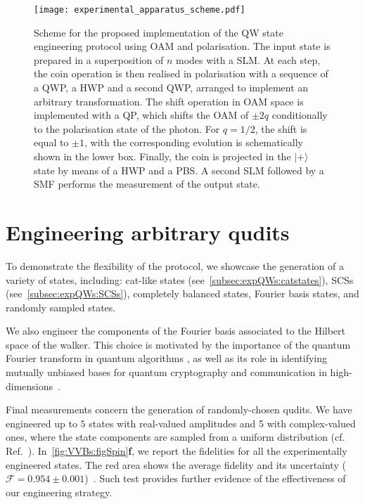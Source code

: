 \begin{figure}[tb]
\centering
\texttt{[image: experimental\_apparatus\_scheme.pdf]}
\caption{
    Scheme for the proposed implementation of the QW state engineering protocol using \ac{OAM} and polarisation.
    The input state is prepared in a superposition of $n$ modes with a \ac{SLM}.
    At each step, the coin operation is then realised in polarisation with a sequence of a \ac{QWP}, a \ac{HWP} and a second QWP, arranged to implement an arbitrary transformation.
    The shift operation in \ac{OAM} space is implemented with a QP, which shifts the \ac{OAM} of $\pm 2q$ conditionally to the polarisation state of the photon.
    For $q=1/2$, the shift is equal to $\pm 1$, with the corresponding evolution is  schematically shown in the lower box.
    Finally, the coin is projected in the $\vert + \rangle$ state by means of a HWP and a \ac{PBS}.
    A second \ac{SLM} followed by a \ac{SMF} performs the measurement of the output state.
}
\label{fig:QWs:proposal_exp}
\end{figure}


\section{Engineering arbitrary qudits}
\label{sec:expQWs:arbitrary_qudits}

To demonstrate the flexibility of the protocol, we showcase the generation of a variety of states, including: cat-like states (see~\cref{subsec:expQWs:catstates}), \acp{SCS} (see~\cref{subsec:expQWs:SCSs}), completely balanced states, Fourier basis states, and randomly sampled states.

We also engineer the components of the Fourier basis associated to the Hilbert space of the walker. This choice is motivated by the importance of the quantum Fourier transform in quantum algorithms \cite{nielsen2002quantum}, as well as its role in identifying mutually unbiased bases for quantum cryptography and communication in high-dimensions~\cite{durt2010mutually,bandyopadhyay2002new,brierley2009constructing,dambrosio2013test}.

Final measurements concern the generation of randomly-chosen qudits. We have engineered up to $5$ states with real-valued amplitudes and 5 with complex-valued ones, where the state components are sampled from a uniform distribution (cf. Ref.~\cite{SI}).
In~\cref{fig:VVBs:figSpin}\textbf{f}, we report the fidelities for all the experimentally engineered states.
The red area shows the average fidelity and its uncertainty ($\mathcal{F}{=}0.954 \pm 0.001$)~\cite{SI}. Such test provides further evidence of the effectiveness of our engineering strategy.

